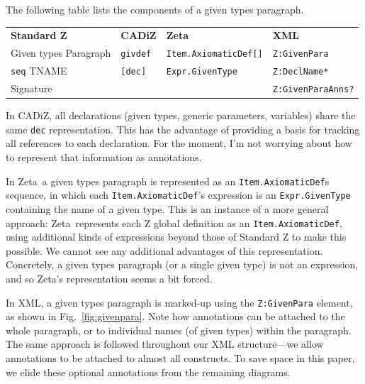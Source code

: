 \documentclass{llncs}  %
\newcommand{\AFont}[1]{\texttt{#1}}
\newcommand{\CADiZ}{CADiZ}
\newcommand{\Zeta}{Zeta}
\newcommand{\AParagraph}{Paragraph}
\newcommand{\TNAME}{TNAME}
\newcommand{\ASignature}{Signature}
\begin{document}
The following table lists the components of a given types paragraph.

\begin{center}
\begin{tabular}{|l|l|l|l|}
\hline
{\bf Standard Z} & {\bf \CADiZ} & {\bf \Zeta} & {\bf XML}\\
Given types \AParagraph & \AFont{givdef} & \AFont{Item.AxiomaticDef[]} & \AFont{Z:GivenPara}\\
\hline
\AFont{seq} \TNAME & \AFont{[dec]} & \AFont{Expr.GivenType} & \AFont{Z:DeclName*}\\
\ASignature & & & \AFont{Z:GivenParaAnns?}\\
\hline
\end{tabular}
\end{center}

In \CADiZ, all declarations
(given types, generic parameters, variables)
share the same \AFont{dec} representation.
This has the advantage of providing a basis for
tracking all references to each declaration.
For the moment, I'm not worrying about
how to represent that information as annotations.

In \Zeta\ a given types paragraph is represented as
an \AFont{Item.AxiomaticDef}s sequence,
in which each \AFont{Item.AxiomaticDef}'s expression
is an \AFont{Expr.GivenType} containing the name of a given type.
This is an instance of a more general approach:
\Zeta\ represents each Z global definition as an \AFont{Item.AxiomaticDef},
using additional kinds of expressions beyond those of Standard Z
to make this possible.
We cannot see any additional advantages of this representation.
Concretely, a given types paragraph (or a single given type) is not an
expression, and so \Zeta's representation seems a bit forced. 

In XML, a given types paragraph is marked-up using
the \AFont{Z:GivenPara} element, as shown in Fig.~\ref{fig:givenpara}.
Note how annotations can be attached to the whole paragraph,
or to individual names (of given types) within the paragraph.
The same approach is followed throughout our XML structure---we allow
annotations to be attached to almost all constructs.  To save space in this
paper, we elide these optional annotations from the remaining diagrams.
\end{document}
